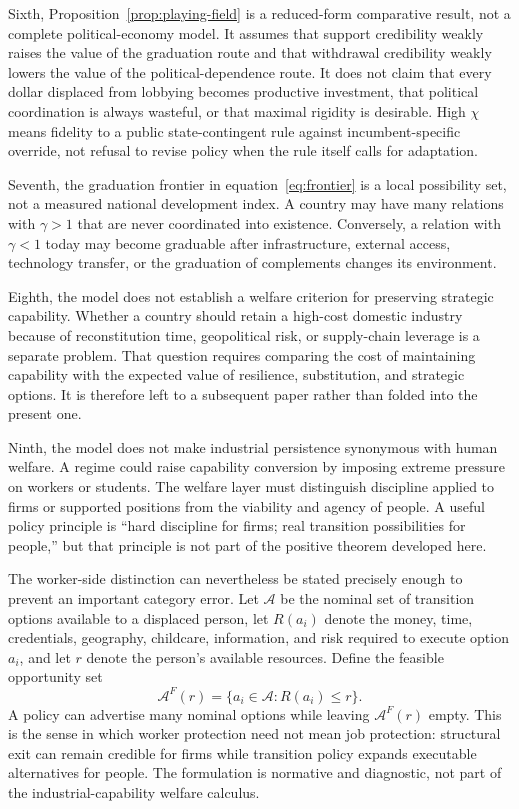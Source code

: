Sixth, Proposition~\ref{prop:playing-field} is a reduced-form comparative result, not a complete political-economy model. It assumes that support credibility weakly raises the value of the graduation route and that withdrawal credibility weakly lowers the value of the political-dependence route. It does not claim that every dollar displaced from lobbying becomes productive investment, that political coordination is always wasteful, or that maximal rigidity is desirable. High $\chi$ means fidelity to a public state-contingent rule against incumbent-specific override, not refusal to revise policy when the rule itself calls for adaptation.

Seventh, the graduation frontier in equation~\eqref{eq:frontier} is a local possibility set, not a measured national development index. A country may have many relations with $\gamma>1$ that are never coordinated into existence. Conversely, a relation with $\gamma<1$ today may become graduable after infrastructure, external access, technology transfer, or the graduation of complements changes its environment.

Eighth, the model does not establish a welfare criterion for preserving strategic capability. Whether a country should retain a high-cost domestic industry because of reconstitution time, geopolitical risk, or supply-chain leverage is a separate problem. That question requires comparing the cost of maintaining capability with the expected value of resilience, substitution, and strategic options. It is therefore left to a subsequent paper rather than folded into the present one.

Ninth, the model does not make industrial persistence synonymous with human welfare. A regime could raise capability conversion by imposing extreme pressure on workers or students. The welfare layer must distinguish discipline applied to firms or supported positions from the viability and agency of people. A useful policy principle is ``hard discipline for firms; real transition possibilities for people,'' but that principle is not part of the positive theorem developed here.

The worker-side distinction can nevertheless be stated precisely enough to prevent an important category error. Let $\mathcal A$ be the nominal set of transition options available to a displaced person, let $R(a_i)$ denote the money, time, credentials, geography, childcare, information, and risk required to execute option $a_i$, and let $r$ denote the person's available resources. Define the feasible opportunity set
\begin{equation}
\mathcal A^F(r)
=
\{a_i\in\mathcal A:R(a_i)\le r\}.
\label{eq:feasible-opportunities}
\end{equation}
A policy can advertise many nominal options while leaving $\mathcal A^F(r)$ empty. This is the sense in which worker protection need not mean job protection: structural exit can remain credible for firms while transition policy expands executable alternatives for people. The formulation is normative and diagnostic, not part of the industrial-capability welfare calculus.

